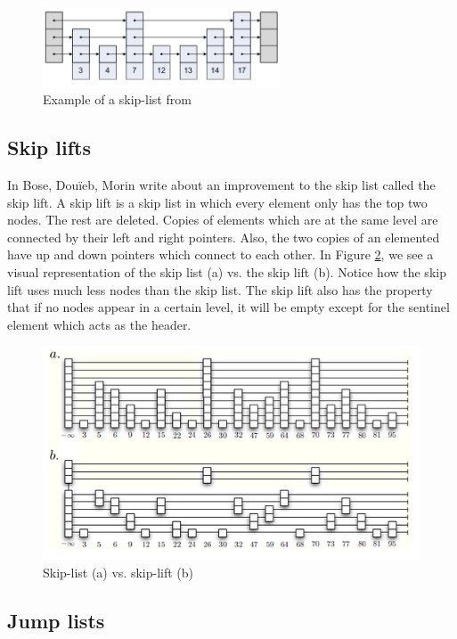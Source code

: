 \documentclass[oribibl]{llncs}
\begin{document}
\begin{figure}[here]
\center
\includegraphics[width=7cm]{images/skip_list1}
\caption{Example of a skip-list from \cite{skip_list}}
\label{fig:skip_list}
\end{figure}

\subsection{Skip lifts}

In \cite{skip_lift} Bose, Douïeb, Morin write about an improvement to the skip list called the skip lift. A skip lift is a skip list in which every element only has the top two nodes. The rest are deleted. Copies of elements which are at the same level are connected by their left and right pointers. Also, the two copies of an elemented have up and down pointers which connect to each other. In Figure \ref{fig:skiplist_vs_skiplift}, we see a visual representation of the skip list (a) vs. the skip lift (b). Notice how the skip lift uses much less nodes than the skip list. The skip lift also has the property that if no nodes appear in a certain level, it will be empty except for the sentinel element which acts as the header.


\begin{figure}[here]
\center
\includegraphics[width=12cm]{images/skiplist_vs_skiplift}
\caption{Skip-list (a)  vs. skip-lift (b)}
\label{fig:skiplist_vs_skiplift}
\end{figure}


\subsection{Jump lists}
\end{document}
